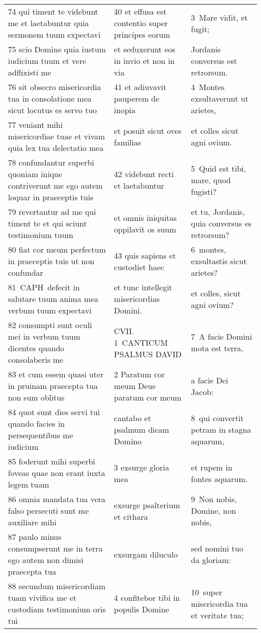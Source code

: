 \documentclass{article}
\begin{document}
\begin{longtable}{@{}p{}p{}p{}@{}}
74 qui timent te videbunt me et laetabuntur quia sermonem tuum expectavi	&	40 et effusa est contentio super principes eorum	&	3 Mare vidit, et fugit;	\\
75 scio Domine quia iustum iudicium tuum et vere adflixisti me	&	et seduxerunt eos in invio et non in via	&	Jordanis conversus est retrorsum.	\\
76 sit obsecro misericordia tua in consolatione mea sicut locutus es servo tuo	&	41 et adiuvavit pauperem de inopia	&	4 Montes exsultaverunt ut arietes,	\\
77 veniant mihi misericordiae tuae et vivam quia lex tua delectatio mea	&	et posuit sicut oves familias	&	et colles sicut agni ovium.	\\
78 confundantur superbi quoniam inique contriverunt me ego autem loquar in praeceptis tuis	&	42 videbunt recti et laetabuntur	&	5 Quid est tibi, mare, quod fugisti?	\\
79 revertantur ad me qui timent te et qui sciunt testimonium tuum	&	et omnis iniquitas oppilavit os suum	&	et tu, Jordanis, quia conversus es retrorsum?	\\
80 fiat cor meum perfectum in praeceptis tuis ut non confundar	&	43 quis sapiens et custodiet haec	&	6 montes, exsultastis sicut arietes?	\\
81 CAPH defecit in salutare tuum anima mea verbum tuum expectavi	&	et tunc intellegit misericordias Domini.	&	et colles, sicut agni ovium?	\\
82 consumpti sunt oculi mei in verbum tuum dicentes quando consolaberis me	&	CVII. 1 CANTICUM PSALMUS DAVID	&	7 A facie Domini mota est terra,	\\
83 et cum essem quasi uter in pruinam praecepta tua non sum oblitus	&	2 Paratum cor meum Deus paratum cor meum	&	a facie Dei Jacob:	\\
84 quot sunt dies servi tui quando facies in persequentibus me iudicium	&	cantabo et psalmum dicam Domino	&	8 qui convertit petram in stagna aquarum,	\\
85 foderunt mihi superbi foveas quae non erant iuxta legem tuam	&	3 exsurge gloria mea	&	et rupem in fontes aquarum.	\\
86 omnia mandata tua vera falso persecuti sunt me auxiliare mihi	&	exsurge psalterium et cithara	&	9 Non nobis, Domine, non nobis,	\\
87 paulo minus consumpserunt me in terra ego autem non dimisi praecepta tua	&	exsurgam diluculo	&	sed nomini tuo da gloriam:	\\
88 secundum misericordiam tuam vivifica me et custodiam testimonium oris tui	&	4 confitebor tibi in populis Domine	&	10 super misericordia tua et veritate tua;	\\

\end{longtable}
\end{document}
